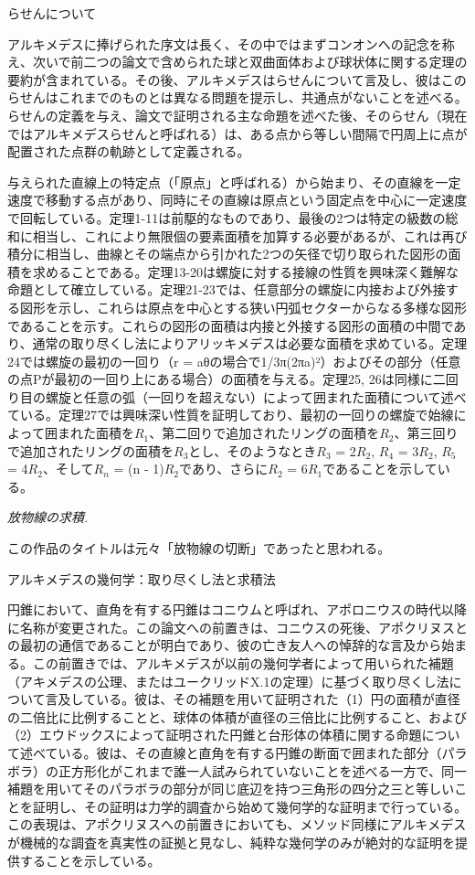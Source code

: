 \documentclass[a4paper,11pt,openany]{ltjsbook}
\begin{document}
らせんについて

アルキメデスに捧げられた序文は長く、その中ではまずコンオンへの記念を称え、次いで前二つの論文で含められた球と双曲面体および球状体に関する定理の要約が含まれている。その後、アルキメデスはらせんについて言及し、彼はこのらせんはこれまでのものとは異なる問題を提示し、共通点がないことを述べる。らせんの定義を与え、論文で証明される主な命題を述べた後、そのらせん（現在ではアルキメデスらせんと呼ばれる）は、ある点から等しい間隔で円周上に点が配置された点群の軌跡として定義される。

与えられた直線上の特定点（「原点」と呼ばれる）から始まり、その直線を一定速度で移動する点があり、同時にその直線は原点という固定点を中心に一定速度で回転している。定理1-11は前駆的なものであり、最後の2つは特定の級数の総和に相当し、これにより無限個の要素面積を加算する必要があるが、これは再び積分に相当し、曲線とその端点から引かれた2つの矢径で切り取られた図形の面積を求めることである。定理13-20は螺旋に対する接線の性質を興味深く難解な命題として確立している。定理21-23では、任意部分の螺旋に内接および外接する図形を示し、これらは原点を中心とする狭い円弧セクターからなる多様な図形であることを示す。これらの図形の面積は内接と外接する図形の面積の中間であり、通常の取り尽くし法によりアリッキメデスは必要な面積を求めている。定理24では螺旋の最初の一回り（r = aθの場合で1/3π(2πa)²）およびその部分（任意の点Pが最初の一回り上にある場合）の面積を与える。定理25, 26は同様に二回り目の螺旋と任意の弧（一回りを超えない）によって囲まれた面積について述べている。定理27では興味深い性質を証明しており、最初の一回りの螺旋で始線によって囲まれた面積を$R_1$、第二回りで追加されたリングの面積を$R_2$、第三回りで追加されたリングの面積を$R_3$とし、そのようなとき$R_3$ = 2$R_2$, $R_4$ = 3$R_2$, $R_5$ = 4$R_2$、そして$R_n$ = (n - 1)$R_2$であり、さらに$R_2$ = 6$R_1$であることを示している。

\textit{放物線の求積.}

この作品のタイトルは元々「放物線の切断」であったと思われる。

アルキメデスの幾何学：取り尽くし法と求積法

円錐において、直角を有する円錐はコニウムと呼ばれ、アポロニウスの時代以降に名称が変更された。この論文への前置きは、コニウスの死後、アポクリヌスとの最初の通信であることが明白であり、彼の亡き友人への悼辞的な言及から始まる。この前置きでは、アルキメデスが以前の幾何学者によって用いられた補題（アキメデスの公理、またはユークリッドX.1の定理）に基づく取り尽くし法について言及している。彼は、その補題を用いて証明された（1）円の面積が直径の二倍比に比例することと、球体の体積が直径の三倍比に比例すること、および（2）エウドックスによって証明された円錐と台形体の体積に関する命題について述べている。彼は、その直線と直角を有する円錐の断面で囲まれた部分（パラボラ）の正方形化がこれまで誰一人試みられていないことを述べる一方で、同一補題を用いてそのパラボラの部分が同じ底辺を持つ三角形の四分之三と等しいことを証明し、その証明は力学的調査から始めて幾何学的な証明まで行っている。この表現は、アポクリヌスへの前置きにおいても、メソッド同様にアルキメデスが機械的な調査を真実性の証拠と見なし、純粋な幾何学のみが絶対的な証明を提供することを示している。
\end{document}
